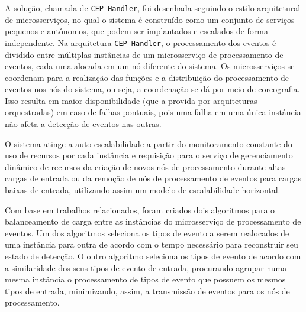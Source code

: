 A solução, chamada de \texttt{CEP Handler}, foi desenhada seguindo o estilo arquitetural de microsserviços, no qual o sistema é construído como um conjunto de serviços pequenos e autônomos, que podem ser implantados e escalados de forma independente. 
Na arquitetura \texttt{CEP Handler}, o processamento dos eventos é dividido entre múltiplas instâncias de um microsserviço de processamento de eventos, cada uma alocada em um nó diferente do sistema. Os microsserviços se coordenam para a realização das funções e a distribuição do processamento de eventos nos nós do sistema, ou seja, a coordenação se dá por meio de coreografia. Isso resulta em maior disponibilidade (que a provida por arquiteturas orquestradas) em caso de falhas pontuais, pois uma falha em uma única instância não afeta a detecção de eventos nas outras. 

O sistema atinge a auto-escalabilidade a partir do monitoramento constante do uso de recursos por cada instância e requisição para o serviço de gerenciamento dinâmico de recursos da criação de novos nós de processamento durante altas cargas de entrada ou da remoção de nós de processamento de eventos para cargas baixas de entrada, utilizando assim um modelo de escalabilidade horizontal.



Com base em trabalhos relacionados, foram  criados dois algoritmos para o balanceamento de carga entre as instâncias do microsserviço de processamento de eventos. Um dos algoritmos seleciona os tipos de evento a serem realocados de uma instância para outra de acordo com o tempo necessário para reconstruir seu estado de detecção. O outro algoritmo seleciona os tipos de evento de acordo com a similaridade dos seus tipos de evento de entrada, procurando agrupar numa mesma instância o processamento de tipos de evento que possuem os mesmos tipos de entrada, minimizando, assim, a transmissão de eventos para os nós de processamento.

 
